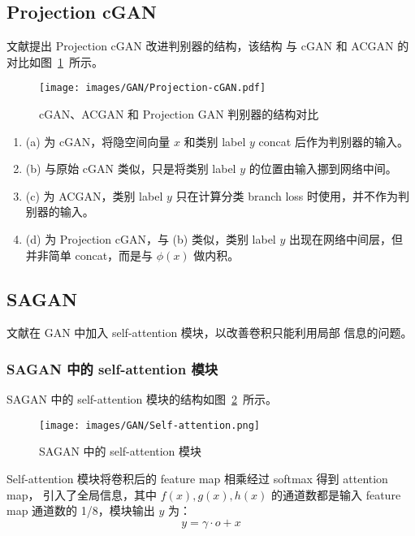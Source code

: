\subsection{Projection cGAN}
文献提出 Projection cGAN 改进判别器的结构，该结构
与 cGAN 和 ACGAN 的对比如图~\ref{fig:projection-gan}~所示。

\begin{figure}[ht]
  \centering
  \texttt{[image: images/GAN/Projection-cGAN.pdf]}
  \caption{cGAN、ACGAN 和 Projection GAN 判别器的结构对比}
  \label{fig:projection-gan}
\end{figure}

\begin{enumerate}
  \item (a) 为 cGAN，将隐空间向量 $x$ 和类别 label $y$ concat 后作为判别器的输入。
  \item (b) 与原始 cGAN 类似，只是将类别 label $y$ 的位置由输入挪到网络中间。
  \item (c) 为 ACGAN，类别 label $y$ 只在计算分类 branch loss 时使用，并不作为判
    别器的输入。
  \item (d) 为 Projection cGAN，与 (b) 类似，类别 label $y$ 出现在网络中间层，但
    并非简单 concat，而是与 $\phi(x)$ 做内积。
\end{enumerate}

\subsection{SAGAN}
文献在 GAN 中加入 self-attention 模块，以改善卷积只能利用局部
信息的问题。

\subsubsection{SAGAN 中的 self-attention 模块}
SAGAN 中的 self-attention 模块的结构如图~\ref{fig:self-attention}~所示。

\begin{figure}[ht]
  \centering
  \texttt{[image: images/GAN/Self-attention.png]}
  \caption{SAGAN 中的 self-attention 模块}
  \label{fig:self-attention}
\end{figure}

Self-attention 模块将卷积后的 feature map 相乘经过 softmax 得到 attention map，
引入了全局信息，其中 $f(x), g(x), h(x)$ 的通道数都是输入 feature map 通道数的
1/8，模块输出 $y$ 为：
\begin{equation}
  \label{equ:self-attention}
  y = \gamma \cdot o + x
\end{equation}


